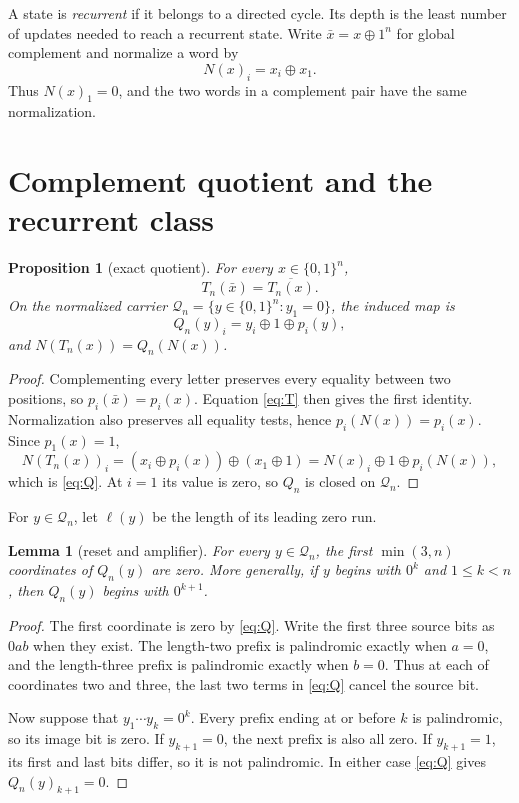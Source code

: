\documentclass[10pt,a4paper]{amsart}
\newtheorem{proposition}[theorem]{Proposition}
\newtheorem{lemma}[theorem]{Lemma}
\theoremstyle{definition}
\theoremstyle{remark}
\newcommand{\Bn}{\{0,1\}^n}
\begin{document}
A state is \emph{recurrent} if it belongs to a directed cycle.  Its depth is
the least number of updates needed to reach a recurrent state.  Write
$\bar x=x\oplus1^n$ for global complement and normalize a word by
\begin{equation}\label{eq:normalize}
 N(x)_i=x_i\oplus x_1.
\end{equation}
Thus $N(x)_1=0$, and the two words in a complement pair have the same
normalization.

\section{Complement quotient and the recurrent class}

\begin{proposition}[exact quotient]\label{prop:quotient}
For every $x\in\Bn$,
\[
 T_n(\bar x)=\overline{T_n(x)}.
\]
On the normalized carrier
$\mathcal Q_n=\{y\in\Bn:y_1=0\}$, the induced map is
\begin{equation}\label{eq:Q}
 Q_n(y)_i=y_i\oplus1\oplus p_i(y),
\end{equation}
and $N(T_n(x))=Q_n(N(x))$.
\end{proposition}

\begin{proof}
Complementing every letter preserves every equality between two positions,
so $p_i(\bar x)=p_i(x)$.  Equation \eqref{eq:T} then gives the first identity.
Normalization also preserves all equality tests, hence
$p_i(N(x))=p_i(x)$.  Since $p_1(x)=1$,
\[
 N(T_n(x))_i
 =(x_i\oplus p_i(x))\oplus(x_1\oplus1)
 =N(x)_i\oplus1\oplus p_i(N(x)),
\]
which is \eqref{eq:Q}.  At $i=1$ its value is zero, so $Q_n$ is closed on
$\mathcal Q_n$.
\end{proof}

For $y\in\mathcal Q_n$, let $\ell(y)$ be the length of its leading zero run.

\begin{lemma}[reset and amplifier]\label{lem:amplifier}
For every $y\in\mathcal Q_n$, the first $\min(3,n)$ coordinates of $Q_n(y)$
are zero.  More generally, if $y$ begins with $0^k$ and $1\le k<n$, then
$Q_n(y)$ begins with $0^{k+1}$.
\end{lemma}

\begin{proof}
The first coordinate is zero by \eqref{eq:Q}.  Write the first three source
bits as $0ab$ when they exist.  The length-two prefix is palindromic exactly
when $a=0$, and the length-three prefix is palindromic exactly when $b=0$.
Thus at each of coordinates two and three, the last two terms in
\eqref{eq:Q} cancel the source bit.

Now suppose that $y_1\cdots y_k=0^k$.  Every prefix ending at or before $k$
is palindromic, so its image bit is zero.  If $y_{k+1}=0$, the next prefix is
also all zero.  If $y_{k+1}=1$, its first and last bits differ, so it is not
palindromic.  In either case \eqref{eq:Q} gives $Q_n(y)_{k+1}=0$.
\end{proof}
\end{document}
